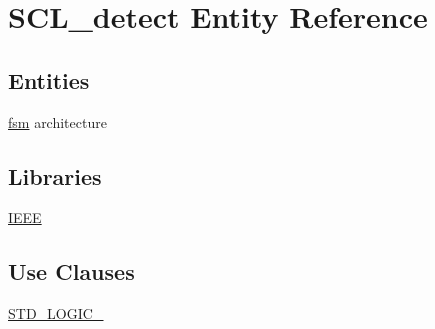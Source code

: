 \hypertarget{class_s_c_l__detect}{}\section{S\+C\+L\+\_\+detect Entity Reference}
\label{class_s_c_l__detect}
\subsection*{Entities}
\begin{DoxyCompactItemize}
\item 
\hyperlink{class_s_c_l__detect_1_1fsm}{fsm} architecture
\end{DoxyCompactItemize}
\subsection*{Libraries}
 \begin{DoxyCompactItemize}
\item 
\hyperlink{class_s_c_l__detect_ae4f03c286607f3181e16b9aa12d0c6d4}{I\+E\+EE} 
\end{DoxyCompactItemize}
\subsection*{Use Clauses}
 \begin{DoxyCompactItemize}
\item 
\hyperlink{class_s_c_l__detect_aa4b2b25246a821511120e3149b003563}{S\+T\+D\+\_\+\+L\+O\+G\+I\+C\+\_}   
\end{DoxyCompactItemize}
